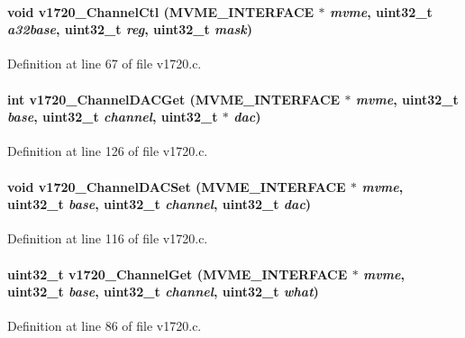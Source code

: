 \paragraph[{v1720\_\-ChannelCtl}]{\setlength{\rightskip}{0pt plus 5cm}void v1720\_\-ChannelCtl ({\bf MVME\_\-INTERFACE} $\ast$ {\em mvme}, \/  uint32\_\-t {\em a32base}, \/  uint32\_\-t {\em reg}, \/  uint32\_\-t {\em mask})}\hfill\label{v1720drv_8h_aa8b204e30463c0621422733510677df4}


Definition at line 67 of file v1720.c.
\paragraph[{v1720\_\-ChannelDACGet}]{\setlength{\rightskip}{0pt plus 5cm}int v1720\_\-ChannelDACGet ({\bf MVME\_\-INTERFACE} $\ast$ {\em mvme}, \/  uint32\_\-t {\em base}, \/  uint32\_\-t {\em channel}, \/  uint32\_\-t $\ast$ {\em dac})}\hfill\label{v1720drv_8h_a39043d4544279b4b83d0c03b92c98d31}


Definition at line 126 of file v1720.c.
\paragraph[{v1720\_\-ChannelDACSet}]{\setlength{\rightskip}{0pt plus 5cm}void v1720\_\-ChannelDACSet ({\bf MVME\_\-INTERFACE} $\ast$ {\em mvme}, \/  uint32\_\-t {\em base}, \/  uint32\_\-t {\em channel}, \/  uint32\_\-t {\em dac})}\hfill\label{v1720drv_8h_aa7e18074b708f4ce0a8530dd7c007caf}


Definition at line 116 of file v1720.c.
\paragraph[{v1720\_\-ChannelGet}]{\setlength{\rightskip}{0pt plus 5cm}uint32\_\-t v1720\_\-ChannelGet ({\bf MVME\_\-INTERFACE} $\ast$ {\em mvme}, \/  uint32\_\-t {\em base}, \/  uint32\_\-t {\em channel}, \/  uint32\_\-t {\em what})}\hfill\label{v1720drv_8h_a9f2af1cbc3d42e6b13c84db35cf07c4f}


Definition at line 86 of file v1720.c.
